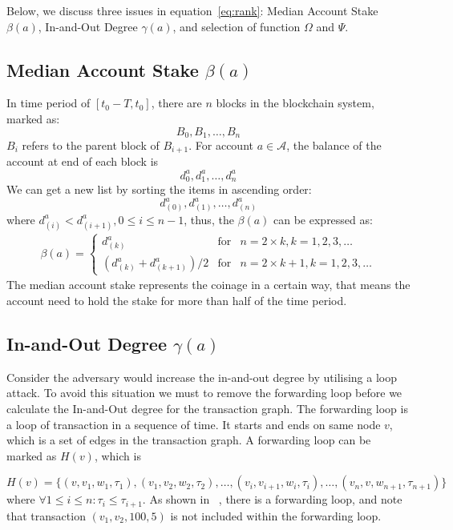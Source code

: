 Below, we discuss three issues in equation~\ref{eq:rank}: Median Account Stake $\beta(a)$, In-and-Out Degree $\gamma(a)$, and selection of function $\Omega$ and $\Psi$.

\subsection{Median Account Stake $\beta(a)$}
In time period of $[t_0-T, t_0]$, there are $n$ blocks in the blockchain system, marked as:
\[
B_0, B_1, \dots, B_n
\]
\noindent $B_{i}$ refers to the parent block of $B_{i+1}$. For account $a \in \mathcal{A}$, the balance of the account at end of each block is
\[
d^a_0, d^a_1, \dots, d^a_n
\]
We can get a new list by sorting the items in ascending order: 
\[
d^a_{(0)}, d^a_{(1)}, \dots, d^a_{(n)}
\]
\noindent where $d^a_{(i)} < d^a_{(i+1)}, 0\le i \le {n-1}$, thus, the $\beta(a)$ can be expressed as:
\begin{align}
\beta(a) = \left\{ \begin{array}{rcl}
{d^a_{(k)}} & \mbox{for} & n=2\times{}k, k=1, 2, 3, \ldots \\
{(d^a_{(k)} + d^a_{(k+1)})/2} & \mbox{for} & n=2\times{}k + 1, k=1, 2, 3, \ldots
\end{array}\right.
\end{align}
The median account stake represents the coinage in a certain way, that means the account need to hold the stake for more than half of the time period.

\subsection{In-and-Out Degree $\gamma(a)$}
Consider the adversary would increase the in-and-out degree by utilising a loop attack. To avoid this situation we must to remove the forwarding loop before we calculate the In-and-Out degree for the transaction graph. The forwarding loop is a loop of transaction in a sequence of time.
It starts and ends on same node $v$, which is a set of edges in the transaction graph. A forwarding loop can be marked as $H(v)$, which is

\[
H(v) = \{(v, v_1, w_1, \tau_1), (v_1, v_2, w_2, \tau_2), \dots, (v_i, v_{i+1}, w_{i}, \tau_i), \dots, (v_n, v, w_{n+1}, \tau_{n+1})\}
\]
\noindent where $\forall 1\le i \le n : \tau_i \le \tau_{i+1} $.
\noindent As shown in ~, there is a forwarding loop, and note that transaction $(v_1, v_2, 100, 5)$ is not included within the forwarding loop.

